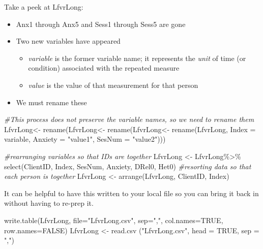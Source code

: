 \documentclass[
  11pt,
]{book}
\newenvironment{Shaded}{\begin{snugshade}}{\end{snugshade}}
\newcommand{\AttributeTok}[1]{\textcolor[rgb]{0.77,0.63,0.00}{#1}}
\newcommand{\CommentTok}[1]{\textcolor[rgb]{0.56,0.35,0.01}{\textit{#1}}}
\newcommand{\ConstantTok}[1]{\textcolor[rgb]{0.00,0.00,0.00}{#1}}
\newcommand{\FunctionTok}[1]{\textcolor[rgb]{0.00,0.00,0.00}{#1}}
\newcommand{\NormalTok}[1]{#1}
\newcommand{\OtherTok}[1]{\textcolor[rgb]{0.56,0.35,0.01}{#1}}
\newcommand{\SpecialCharTok}[1]{\textcolor[rgb]{0.00,0.00,0.00}{#1}}
\newcommand{\StringTok}[1]{\textcolor[rgb]{0.31,0.60,0.02}{#1}}
\providecommand{\tightlist}{%
  \setlength{\itemsep}{0pt}\setlength{\parskip}{0pt}}
\begin{document}
Take a peek at LfvrLong:

\begin{itemize}
\tightlist
\item
  Anx1 through Anx5 and Sess1 through Sess5 are gone
\item
  Two new variables have appeared

  \begin{itemize}
  \tightlist
  \item
    \emph{variable} is the former variable name; it represents the \emph{unit} of time (or condition) associated with the repeated measure
  \item
    \emph{value} is the value of that measurement for that person
  \end{itemize}
\item
  We must rename these
\end{itemize}

\begin{Shaded}
\begin{Highlighting}[]
\CommentTok{\#This process  does not preserve the variable names, so we need to rename them}
\NormalTok{LfvrLong}\OtherTok{\textless{}{-}}  \FunctionTok{rename}\NormalTok{(LfvrLong}\OtherTok{\textless{}{-}}  \FunctionTok{rename}\NormalTok{(LfvrLong}\OtherTok{\textless{}{-}}  \FunctionTok{rename}\NormalTok{(LfvrLong, }\AttributeTok{Index =}\NormalTok{ variable, }\AttributeTok{Anxiety =} \StringTok{"value1"}\NormalTok{, }\AttributeTok{SesNum =} \StringTok{"value2"}\NormalTok{)))}

\CommentTok{\#rearranging variables so that IDs are together}
\NormalTok{LfvrLong }\OtherTok{\textless{}{-}}\NormalTok{ LfvrLong}\SpecialCharTok{\%\textgreater{}\%}
  \FunctionTok{select}\NormalTok{(ClientID, Index, SesNum, Anxiety, DRel0, Het0)}
\CommentTok{\#resorting data so that each person is together}
\NormalTok{LfvrLong }\OtherTok{\textless{}{-}} \FunctionTok{arrange}\NormalTok{(LfvrLong, ClientID, Index)}
\end{Highlighting}
\end{Shaded}

It can be helpful to have this written to your local file so you can bring it back in without having to re-prep it.

\begin{Shaded}
\begin{Highlighting}[]
\FunctionTok{write.table}\NormalTok{(LfvrLong, }\AttributeTok{file=}\StringTok{"LfvrLong.csv"}\NormalTok{, }\AttributeTok{sep=}\StringTok{","}\NormalTok{, }\AttributeTok{col.names=}\ConstantTok{TRUE}\NormalTok{, }\AttributeTok{row.names=}\ConstantTok{FALSE}\NormalTok{)}
\NormalTok{LfvrLong }\OtherTok{\textless{}{-}} \FunctionTok{read.csv}\NormalTok{ (}\StringTok{"LfvrLong.csv"}\NormalTok{, }\AttributeTok{head =} \ConstantTok{TRUE}\NormalTok{, }\AttributeTok{sep =} \StringTok{","}\NormalTok{)}
\end{Highlighting}
\end{Shaded}
\end{document}
